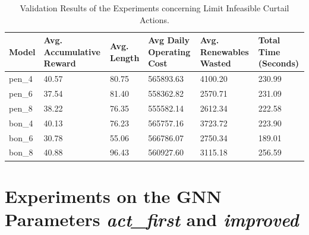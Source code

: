 \begin{table}[ht]
	\centering
	\begin{tabularx}{\textwidth}{|l|X|X|X|X|X|}
		\hline
		\textbf{Model} & \textbf{Avg. Accumulative Reward }& \textbf{Avg. Length} & \textbf{Avg Daily Operating Cost} & \textbf{Avg. Renewables Wasted} & \textbf{Total Time (Seconds)}\\
		\hline
		pen\_4 & 40.57 & 80.75 & 565893.63 & 4100.20 & 230.99 \\
		pen\_6 & 37.54 & 81.40 & 558362.82 & 2570.71 & 231.09 \\
		pen\_8 & 38.22 & 76.35 & 555582.14 & 2612.34 & 222.58 \\
		bon\_4 & 40.13 & 76.23 & 565757.16 & 3723.72 & 223.90 \\
		bon\_6 & 30.78 & 55.06 & 566786.07 & 2750.34 & 189.01 \\
		bon\_8 & 40.88 & 96.43 & 560927.60 & 3115.18 & 256.59 \\
		\hline
	\end{tabularx}
	\caption{Validation Results of the Experiments concerning Limit Infeasible Curtail Actions.}
	\label{fig:curtail-val}
\end{table}

\section{Experiments on the \ac{GNN} Parameters \textit{act\_first} and \textit{improved}}

